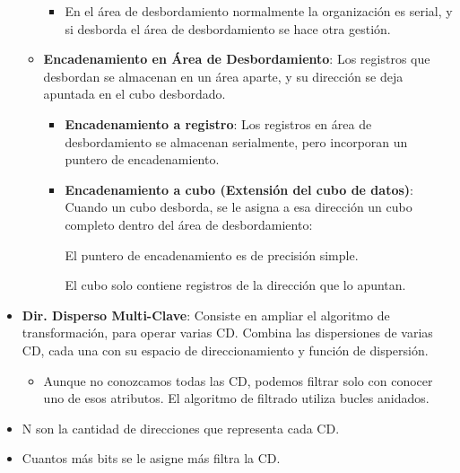 \documentclass[12pt, twoside, openright]{report} %
\begin{document}
\begin{itemize}
\begin{itemize}
\begin{itemize}
        \item En el área de desbordamiento normalmente la organización es
          serial, y si desborda el área de desbordamiento se hace otra
          gestión.
          
        \end{itemize}
      \item \textbf{Encadenamiento en Área de Desbordamiento}: Los registros
        que desbordan se almacenan en un área aparte, y su dirección se
        deja apuntada en el cubo desbordado.
        

        \begin{itemize}
        \item \textbf{Encadenamiento a registro}: Los registros en área de
          desbordamiento se almacenan serialmente, pero incorporan un
          puntero de encadenamiento.
          
        \item \textbf{Encadenamiento a cubo (Extensión del cubo de datos)}:
          Cuando un cubo desborda, se le asigna a esa dirección un cubo
          completo dentro del área de desbordamiento:
          

         
            El puntero de encadenamiento es de precisión simple.
           
			
            El cubo solo contiene registros de la dirección que lo
            apuntan.
       
        \end{itemize}
      \end{itemize}
    \item \textbf{Dir. Disperso Multi-Clave}: Consiste en ampliar el
      algoritmo de transformación, para operar varias CD. Combina las
      dispersiones de varias CD, cada una con su espacio de
      direccionamiento y función de dispersión.
      

      \begin{itemize}
      \item Aunque no conozcamos todas las CD, podemos filtrar solo con
        conocer uno de esos atributos. El algoritmo de filtrado utiliza
        bucles anidados.
        
      \end{itemize}
    \item N son la cantidad de direcciones que representa cada CD.
      
    \item Cuantos más bits se le asigne más filtra la CD.
      

\end{itemize}
\end{document}
